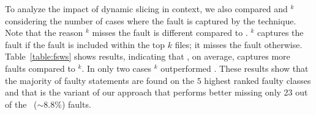 \documentclass{article}
\begin{document}
To analyze the impact of dynamic slicing in context, we also compared
 and \sfl{}$^{k}$ considering the number of cases where the
fault is captured by the technique. Note that the reason \sfl{}$^{k}$
misses the fault is different compared to . \sfl{}$^{k}$
captures the fault if the fault is included within the top $k$ files;
it misses the fault otherwise. Table~\ref{table:fsws} shows results,
indicating that , on average, captures more faults compared
to \sfl{}$^{k}$. In only two cases \sfl{}$^{k}$ outperformed
. These results show that the majority of faulty statements
are found on the $5$ highest ranked faulty classes and that
 is the variant of our approach that performs better
missing only 23 out of the \numFaults\ ($\sim$8.8\%) faults.


\end{document}

